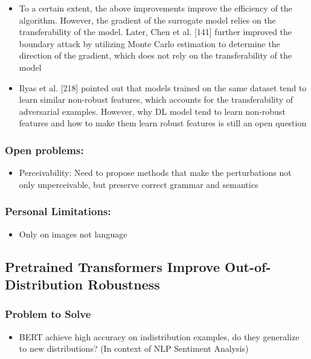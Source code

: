\documentclass{article}
\begin{document}
\begin{flushleft}
\begin{itemize}
\item To a certain extent, the above improvements improve the efficiency of the algorithm. However, the gradient of the surrogate model relies on the transferability of the model. Later, Chen et al. [141] further improved the boundary attack by
utilizing Monte Carlo estimation to determine the direction of the gradient, which does not rely on the transferability of the model

\item Ilyas et al. [218] pointed out that models trained on the same dataset tend to learn similar non-robust features, which accounts for the transferability of adversarial examples. However, why DL model tend to learn non-robust features and how to make them learn robust
features is still an open question 

\end{itemize}

\subsubsection*{Open problems:}
\begin{itemize}
  \item Perceivability: Need to propose methods that make the perturbations not only unperceivable, but preserve correct grammar and semantics      
\end{itemize}

\subsubsection*{Personal Limitations:}
\begin{itemize}
  \item Only on images not language
\end{itemize}




 
 \subsection{Pretrained Transformers Improve Out-of-Distribution Robustness\cite{}} 
\subsubsection*{Problem to Solve}
\begin{itemize}
    \item BERT achieve high accuracy on indistribution examples, do they generalize to new distributions? (In context of NLP Sentiment Analysis)
\end{itemize}


\end{flushleft}
\end{document}
